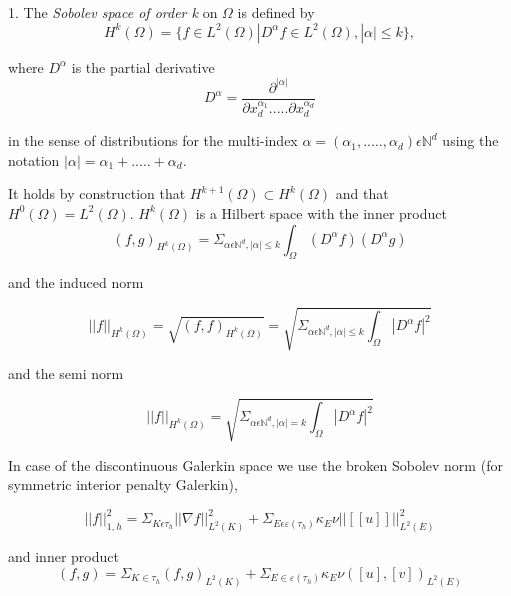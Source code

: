 \documentclass[a4paper,12pt]{book}
\begin{document}
1. The \textit{Sobolev space of order k} on $\Omega$ is defined by\\
\begin{equation}
H^k (\Omega) = \lbrace f \in L^2 (\Omega) | D^\alpha f \in L^2 (\Omega), |\alpha| \leq k \rbrace ,
\end{equation} 

where $D^\alpha$ is the partial derivative
\begin{equation}
D^\alpha = \frac{\partial^{|\alpha|}}{\partial x_d^{\alpha_1} ..... \partial x_d^{\alpha_d}}
\end{equation}

in the sense of distributions for the multi-index $\alpha = (\alpha_1,.....,\alpha_d) \epsilon \mathbb{N}^d$ using the notation $|\alpha| = \alpha_1 + ..... + \alpha_d $.

It holds by construction that $H^{k+1}(\Omega) \subset H^k (\Omega)$ and that $H^0 (\Omega) = L^2 (\Omega)$. $H^k(\Omega)$ is a Hilbert space with the inner product
\begin{equation}
(f,g)_{H^k(\Omega)} = \Sigma_{\alpha \epsilon \mathbb{N}^d, |\alpha| \leq k} \int_\Omega (D^\alpha f) (D^\alpha g)
\end{equation}

and the induced norm 

\begin{equation}
||f||_{H^k (\Omega)} = \sqrt{(f,f)_{H^k(\Omega)}} = \sqrt{\Sigma_{\alpha \epsilon \mathbb{N}^d, |\alpha| \leq k} \int_\Omega |D^\alpha f|^2}
\end{equation}

and the semi norm 

\begin{equation}
||f||_{H^k (\Omega)} = \sqrt{\Sigma_{\alpha \epsilon \mathbb{N}^d, |\alpha| = k} \int_\Omega |D^\alpha f|^2}
\end{equation}

In case of the discontinuous Galerkin space we use the broken Sobolev norm (for symmetric interior penalty Galerkin), \cite{Montlaur2}

\begin{equation}
||f||_{1,h}^2 = \Sigma_{K \epsilon \tau_h} ||\nabla f||_{L^2(K)}^2 + \Sigma_{E \epsilon \varepsilon(\tau_h)} \kappa_E \nu ||[[u]]||_{L^2 (E)}^2
\end{equation}

and inner product \\

\begin{equation}
(f,g) = \Sigma_{K \in \tau_h} (f,g)_{L^2(K)} + \Sigma_{E \in \varepsilon(\tau_h)} \kappa_E \nu ([u],[v])_{L^2 (E)}
\end{equation}
\end{document}
